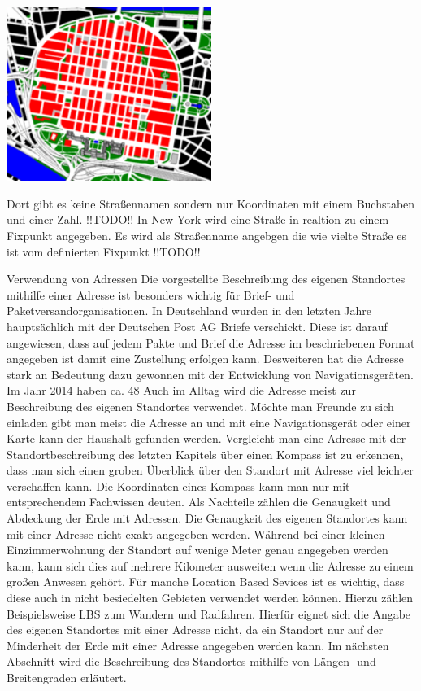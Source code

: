 \includegraphics[width=0.50\textwidth]{ref/images/quadratemannheim.png}

Dort gibt es keine Straßennamen sondern nur Koordinaten mit einem Buchstaben und einer Zahl.
!!TODO!! In New York wird eine Straße in realtion zu einem Fixpunkt angegeben. Es wird als Straßenname angebgen die wie vielte Straße es ist vom definierten Fixpunkt !!TODO!! 



Verwendung von Adressen
Die vorgestellte Beschreibung des eigenen Standortes mithilfe einer Adresse ist besonders wichtig für Brief- und Paketversandorganisationen. In Deutschland wurden in den letzten Jahre hauptsächlich mit der Deutschen Post AG Briefe verschickt. Diese ist darauf angewiesen, dass auf jedem Pakte und Brief die Adresse im beschriebenen Format angegeben ist damit eine Zustellung erfolgen kann.
Desweiteren  hat die Adresse stark an Bedeutung dazu gewonnen mit der Entwicklung von Navigationsgeräten. Im Jahr 2014 haben ca. 48%
Auch im Alltag wird die Adresse meist zur Beschreibung des eigenen Standortes verwendet. Möchte man Freunde zu sich einladen gibt man meist die Adresse an und mit eine Navigationsgerät oder einer Karte kann der Haushalt gefunden werden.
Vergleicht man eine Adresse mit der Standortbeschreibung des letzten Kapitels über einen Kompass ist zu erkennen, dass man sich einen groben Überblick über den Standort mit Adresse viel leichter verschaffen kann. Die Koordinaten eines Kompass kann man nur mit entsprechendem Fachwissen deuten. 
Als Nachteile zählen die Genaugkeit und Abdeckung der Erde mit Adressen. Die Genaugkeit des eigenen Standortes kann mit einer Adresse nicht exakt angegeben werden. Während bei einer kleinen Einzimmerwohnung der Standort auf wenige Meter genau angegeben werden kann, kann sich dies auf mehrere Kilometer ausweiten wenn die Adresse zu einem großen Anwesen gehört. Für manche Location Based Sevices ist es wichtig, dass diese auch in nicht besiedelten Gebieten verwendet werden können. Hierzu zählen Beispielsweise LBS zum Wandern und Radfahren. Hierfür eignet sich die Angabe des eigenen Standortes mit einer Adresse nicht, da ein Standort nur auf der Minderheit der Erde mit einer Adresse angegeben werden kann. 
Im nächsten Abschnitt wird die Beschreibung des Standortes mithilfe von Längen- und Breitengraden erläutert.


